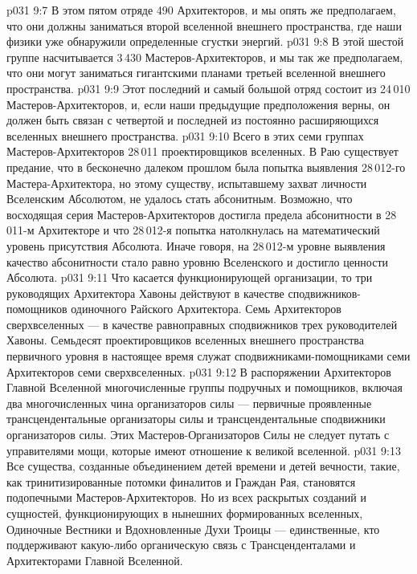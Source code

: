 \vs p031 9:7 \bibnobreakspace {} В этом пятом отряде 490 Архитекторов, и мы опять же предполагаем, что они должны заниматься второй вселенной внешнего пространства, где наши физики уже обнаружили определенные сгустки энергий.
\vs p031 9:8 \bibnobreakspace {} В этой шестой группе насчитывается 3\,430 Мастеров\hyp{}Архитекторов, и мы так же предполагаем, что они могут заниматься гигантскими планами третьей вселенной внешнего пространства.
\vs p031 9:9 \bibnobreakspace {} Этот последний и самый большой отряд состоит из 24\,010 Мастеров\hyp{}Архитекторов, и, если наши предыдущие предположения верны, он должен быть связан с четвертой и последней из постоянно расширяющихся вселенных внешнего пространства.
\vs p031 9:10 \pc Всего в этих семи группах Мастеров\hyp{}Архитекторов 28\,011 проектировщиков вселенных. В Раю существует предание, что в бесконечно далеком прошлом была попытка выявления 28\,012\hyp{}го Мастера\hyp{}Архитектора, но этому существу, испытавшему захват личности Вселенским Абсолютом, не удалось стать абсонитным. Возможно, что восходящая серия Мастеров\hyp{}Архитекторов достигла предела абсонитности в 28\,011\hyp{}м Архитекторе и что 28\,012\hyp{}я попытка натолкнулась на математический уровень присутствия Абсолюта. Иначе говоря, на 28\,012\hyp{}м уровне выявления качество абсонитности стало равно уровню Вселенского и достигло ценности Абсолюта.
\vs p031 9:11 \pc Что касается функционирующей организации, то три руководящих Архитектора Хавоны действуют в качестве сподвижников\hyp{}помощников одиночного Райского Архитектора. Семь Архитекторов сверхвселенных --- в качестве равноправных сподвижников трех руководителей Хавоны. Семьдесят проектировщиков вселенных внешнего пространства первичного уровня в настоящее время служат сподвижниками\hyp{}помощниками семи Архитекторов семи сверхвселенных.
\vs p031 9:12 В распоряжении Архитекторов Главной Вселенной многочисленные группы подручных и помощников, включая два многочисленных чина организаторов силы --- первичные проявленные трансцендентальные организаторы силы и трансцендентальные сподвижники организаторов силы. Этих Мастеров\hyp{}Организаторов Силы не следует путать с управителями мощи, которые имеют отношение к великой вселенной.
\vs p031 9:13 Все существа, созданные объединением детей времени и детей вечности, такие, как тринитизированные потомки финалитов и Граждан Рая, становятся подопечными Мастеров\hyp{}Архитекторов. Но из всех раскрытых созданий и сущностей, функционирующих в нынешних формированных вселенных, Одиночные Вестники и Вдохновленные Духи Троицы --- единственные, кто поддерживают какую\hyp{}либо органическую связь с Трансценденталами и Архитекторами Главной Вселенной.
